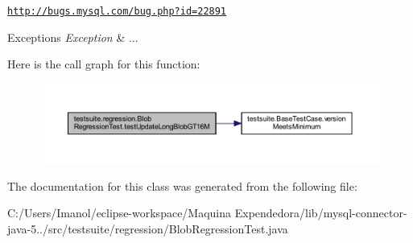 \href{http://bugs.mysql.com/bug.php?id=22891}{\tt http\+://bugs.\+mysql.\+com/bug.\+php?id=22891}


\begin{DoxyExceptions}{Exceptions}
{\em Exception} & ... \\
\hline
\end{DoxyExceptions}
Here is the call graph for this function\+:
\nopagebreak
\begin{figure}[H]
\begin{center}
\leavevmode
\includegraphics[width=350pt]{classtestsuite_1_1regression_1_1_blob_regression_test_a25e07d454d6ad14097ae4b5c5b1bab10_cgraph}
\end{center}
\end{figure}


The documentation for this class was generated from the following file\+:\begin{DoxyCompactItemize}
\item 
C\+:/\+Users/\+Imanol/eclipse-\/workspace/\+Maquina Expendedora/lib/mysql-\/connector-\/java-\/5../src/testsuite/regression/Blob\+Regression\+Test.\+java\end{DoxyCompactItemize}
